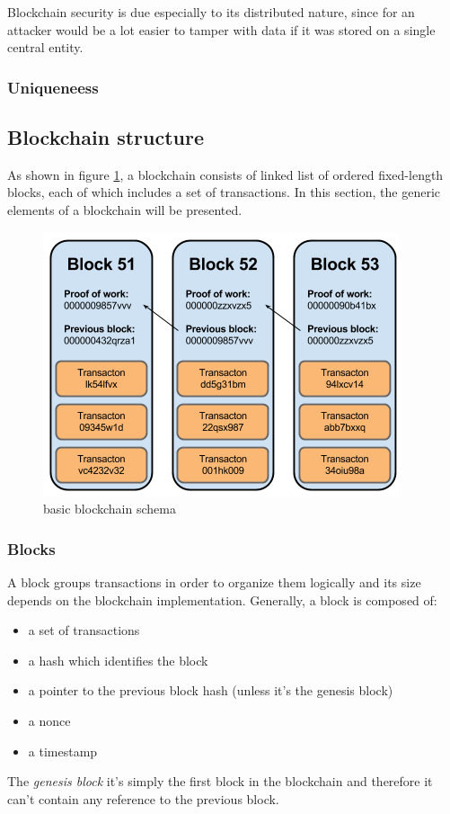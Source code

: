 Blockchain security is due especially to its distributed nature, since for an
attacker would be a lot easier to tamper with data if it was stored on a single
central entity.

\subsubsection*{Uniqueneess}








\subsection{Blockchain structure}
As shown in figure \ref{fig:blockchain-basic-schema}, a blockchain consists of
linked list of ordered fixed-length blocks, each of which includes a set of transactions.
In this section, the generic elements of a blockchain will be presented.
\begin{figure}[!htb]
	\centering
	\includegraphics[width=0.5\linewidth]{img/blockchain-basic-schema.png}
	\caption{basic blockchain schema}
	\label{fig:blockchain-basic-schema}
\end{figure}

\subsubsection*{Blocks}
A block groups transactions in order to organize them logically and its size
depends on the blockchain implementation. Generally, a block is composed of:
\begin{itemize}
  \item a set of transactions
  \item a hash which identifies the block
  \item a pointer to the previous block hash (unless it's the genesis block)
  \item a nonce
  \item a timestamp
\end{itemize}
The \emph{genesis block} it's simply the first block in the blockchain and therefore
it can't contain any reference to the previous block.


